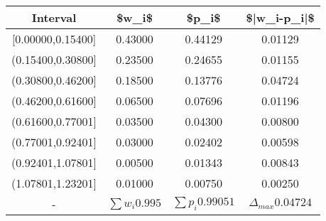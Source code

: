 %
\normalsize%
\begin{longtabu}spread 0pt{|c|c|c|c|}%
\hline%
Interval&\$w\_i\$&\$p\_i\$&\$|w\_i{-}p\_i|\$\\%
\hline%
{[}0.00000,0.15400{]}&0.43000&0.44129&0.01129\\%
\hline%
(0.15400,0.30800{]}&0.23500&0.24655&0.01155\\%
\hline%
(0.30800,0.46200{]}&0.18500&0.13776&0.04724\\%
\hline%
(0.46200,0.61600{]}&0.06500&0.07696&0.01196\\%
\hline%
(0.61600,0.77001{]}&0.03500&0.04300&0.00800\\%
\hline%
(0.77001,0.92401{]}&0.03000&0.02402&0.00598\\%
\hline%
(0.92401,1.07801{]}&0.00500&0.01343&0.00843\\%
\hline%
(1.07801,1.23201{]}&0.01000&0.00750&0.00250\\%
\hline%
{-}&$\sum w_i 0.995$&$\sum p_i 0.99051$&$\Delta_{max}0.04724$\\%
\hline%
\end{longtabu}%
%